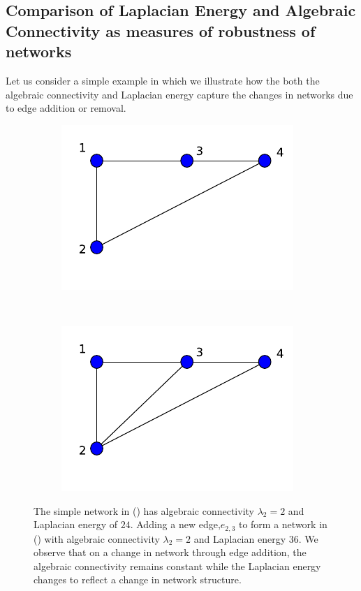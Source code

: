 \documentclass[10pt,a4paper]{article}
\begin{document}
\subsection{Comparison of Laplacian Energy and Algebraic Connectivity as measures of robustness of networks}
Let us consider a simple example in which we illustrate how the both the algebraic connectivity and Laplacian energy capture the changes in networks due to edge addition or removal. 
\begin{figure}[H]
	\centering
	\begin{subfigure}[b]{0.3\textwidth}
		\includegraphics[width=\textwidth]{images/lap-algebraic.pdf}
		\caption{}
		\label{algebraic1}
	\end{subfigure}~
	\begin{subfigure}[b]{0.3\textwidth}
		\includegraphics[width= \textwidth]{images/lap-algebraic2.pdf}
		\caption{}
		\label{algebraic2}
	\end{subfigure}
	\caption{The simple network in () has algebraic connectivity $\lambda_2 = 2$ and Laplacian energy of $24$. Adding a new edge,$e_{2,3}$ to form a network in () with algebraic connectivity $\lambda_2 = 2$ and Laplacian energy $36$. We observe that on a change in network through edge addition, the algebraic connectivity remains constant while the Laplacian energy changes to reflect a change in network structure.}
	\label{}
\end{figure}
\end{document}
